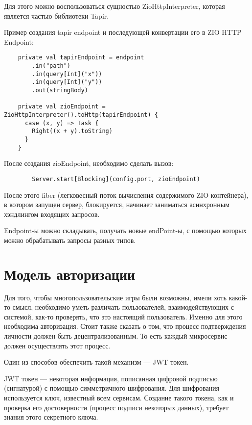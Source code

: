 \documentclass[14pt]{extarticle}
\begin{document}
    Для этого можно воспользоваться сущностью ZioHttpInterpreter, которая является частью библиотеки Tapir.

    Пример создания tapir endpoint и последующей конвертации его в ZIO HTTP Endpoint:

    \begin{verbatim}
    private val tapirEndpoint = endpoint
        .in("path")
        .in(query[Int]("x"))
        .in(query[Int]("y"))
        .out(stringBody)

    private val zioEndpoint = ZioHttpInterpreter().toHttp(tapirEndpoint) {
      case (x, y) => Task {
        Right((x + y).toString)
      }
    }
    \end{verbatim}

    После создания zioEndpoint, необходимо сделать вызов:

    \begin{verbatim}
        Server.start[Blocking](config.port, zioEndpoint)
    \end{verbatim}

    После этого fiber (легковесный поток вычисления содержимого ZIO контейнера), в котором запущен сервер,
    блокируется, начинает заниматься асинхронным хэндлингом входящих запросов.

    Endpoint-ы можно складывать, получать новые endPoint-ы, с помощью которых можно обрабатывать запросы разных типов.

    \section{Модель авторизации}

    Для того, чтобы
    многопользовательские игры были
    возможны, имели хоть какой-то смысл, необходимо уметь различать пользователей, взаимодействующих с системой,
    как-то проверять, что это настоящий пользователь. Именно для этого необходима авторизация.
    Стоит также сказать о том, что процесс подтверждения личности должен быть децентрализованным. То есть каждый
    микросервис должен осуществлять этот процесс.

    Один из способов обеспечить такой механизм --- JWT токен. \cite{jwt}

    JWT токен --- некоторая информация, пописанная цифровой подписью (сигнатурой) с помощью симметричного шифрования.
    Для шифрования используется ключ, известный всем сервисам. Создание такого токена, как и проверка его
    достоверности (процесс подписи некоторых
    данных), требует знания этого секретного ключа.
\end{document}
